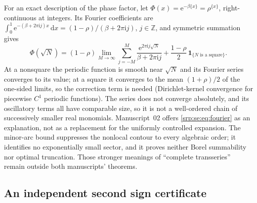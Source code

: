 \documentclass[11pt,a4paper]{article}
\numberwithin{equation}{section}
\theoremstyle{definition}
\theoremstyle{remark}
\newcommand{\dd}{\,\mathrm d}
\newcommand{\e}{\mathrm e}
\newcommand{\ii}{\mathrm i}
\begin{document}
For an exact description of the phase factor, let
$\Phi(x)=\e^{-\beta\{x\}}=\rho^{\{x\}}$, right-continuous at integers. Its
Fourier coefficients are
$\int_0^1\e^{-(\beta+2\pi\ii j)x}\dd x=(1-\rho)/(\beta+2\pi\ii j)$,
$j\in\mathbb Z$, and symmetric summation gives
\begin{equation}
 \Phi(\sqrt N)=(1-\rho)\lim_{M\to\infty}\sum_{j=-M}^{M}
 \frac{\e^{2\pi\ii j\sqrt N}}{\beta+2\pi\ii j}
 +\frac{1-\rho}2\,\mathbf 1_{\{N\text{ is a square}\}}.
 \label{srp:se:eq:fourier}
\end{equation}
At a nonsquare the periodic function is smooth near $\sqrt N$ and its
Fourier series converges to its value; at a square it converges to the
mean $(1+\rho)/2$ of the one-sided limits, so the correction term is
needed (Dirichlet-kernel convergence for piecewise $C^1$ periodic
functions). The series does not converge absolutely, and its oscillatory
terms all have comparable size, so it is not a well-ordered chain of
successively smaller real monomials. Manuscript~02 offers
\eqref{srp:se:eq:fourier} as an explanation, not as a replacement for the
uniformly controlled expansion. The minor-arc bound suppresses the
nonlocal contour to every algebraic order; it identifies no exponentially
small sector, and it proves neither Borel summability nor optimal
truncation. Those stronger meanings of ``complete transseries'' remain
outside both manuscripts' theorems.

\subsection{An independent second sign certificate}
\label{srp:se:sec:certificate}
\end{document}
